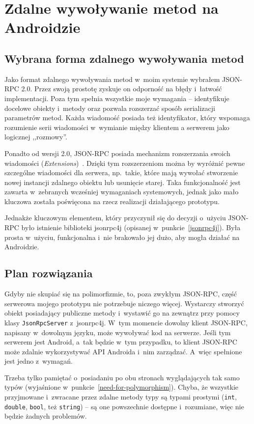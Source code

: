 \section{Zdalne wywoływanie metod na Androidzie}
\label{android-rpc}

\subsection{Wybrana forma zdalnego wywoływania metod}
Jako format zdalnego wywoływania metod w~moim systemie wybrałem JSON-RPC 2.0. Przez swoją prostotę zyskuje on odporność na błędy i~łatwość implementacji.
Poza tym spełnia wszystkie moje wymagania -- identyfikuje docelowe obiekty i~metody oraz pozwala rozszerzać sposób serializacji parametrów metod.
Każda wiadomość posiada też identyfikator, który wspomaga rozumienie serii wiadomości w~wymianie między klientem a serwerem jako logicznej ,,rozmowy''.

Ponadto od wersji 2.0, JSON-RPC posiada mechanizm rozszerzania swoich wiadomości (\emph{Extensions})~\cite{json-rpc-extensions}.
Dzięki tym rozszerzeniom można by wyróżnić pewne szczególne wiadomości dla serwera, np.\ takie, które mają wywołać stworzenie nowej instancji zdalnego obiektu lub usunięcie starej.
Taka funkcjonalność jest zawarta w~zebranych wcześniej wymaganiach systemowych, jednak jako mało kluczowa została poświęcona na rzecz realizacji działającego prototypu.

Jednakże kluczowym elementem, który przyczynił się do decyzji o~użyciu JSON-RPC było istnienie biblioteki jsonrpc4j (opisanej w~punkcie~\ref{jsonrpc4j}). Była prosta w~użyciu, funkcjonalna i~nie brakowało jej dużo, aby mogła działać na Androidzie.


\subsection{Plan rozwiązania}
Gdyby nie skupiać się na polimorfizmie, to, poza zwykłym JSON-RPC, część serwerowa mojego prototypu nie potrzebuje niczego więcej.
Wystarczy stworzyć obiekt posiadający publiczne metody i~wystawić go na zewnątrz przy pomocy klasy \texttt{JsonRpcServer} z~jsonrpc4j.
W~tym momencie dowolny klient JSON-RPC, napisany w~dowolnym języku, może wywoływać kod na serwerze.
Jeśli tym serwerem jest Android, a~tak będzie w~tym przypadku, to klient JSON-RPC może zdalnie wykorzystywać API Androida i~nim zarządzać. A~więc spełnione jest jedno z~wymagań.

Trzeba tylko pamiętać o~posiadaniu po obu stronach wyglądających tak samo typów (wyjaśnione w~punkcie~\ref{need-for-polymorphism}).
Chyba, że wszystkie przyjmowane i~zwracane przez zdalne metody typy są typami prostymi (\texttt{int}, \texttt{double}, \texttt{bool}, też \texttt{string}) -- są one powszechnie dostępne i~rozumiane, więc nie będzie żadnych problemów.

